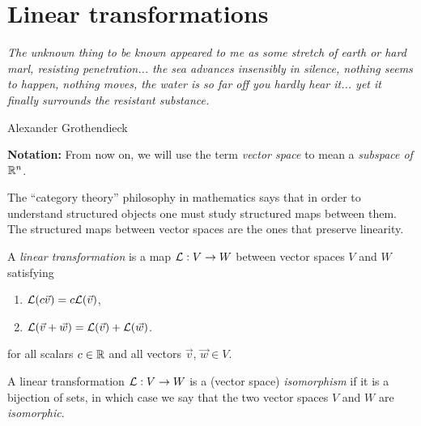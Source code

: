 
\section{Linear transformations}
\label{section:linearTransformation}
\setlength{\epigraphwidth}{0.6\textwidth}
\epigraph{\it The unknown thing to be known appeared to me as some stretch of earth or hard marl, resisting penetration... the sea advances insensibly in silence, nothing seems to happen, nothing moves, the water is so far off you hardly hear it... yet it finally surrounds the resistant substance. }{Alexander Grothendieck}

\begin{mdframed}
  {\bf Notation: } From now on, we will use the term \emph{vector space} to mean a \emph{subspace of $\mathbb{R}^n$}.
\end{mdframed}

The ``category theory'' philosophy in mathematics says that in order to understand structured objects one must study structured maps between them.
The structured maps between vector spaces are the ones that preserve linearity.

\begin{definition}
  A \emph{linear transformation} is a map $\mathcal{L}: V \rightarrow W$ between vector spaces $V$ and $W$ satisfying
  \begin{enumerate}
    \item $\mathcal{L}(c \vec{v}) = c \mathcal{L} (\vec{v})$,
    \item $\mathcal{L}(\vec{v} + \vec{w}) = \mathcal{L} (\vec{v}) + \mathcal{L} (\vec{w})$.
  \end{enumerate}
  for all scalars $c \in \mathbb{R}$ and all vectors $\vec{v}$, $\vec{w} \in V$.

  A linear transformation  $\mathcal{L}: V \rightarrow W$ is a (vector space) \emph{isomorphism} if it is a bijection of sets, in which case we say that the two vector spaces $V$ and $W$ are \emph{isomorphic}.
\end{definition}

